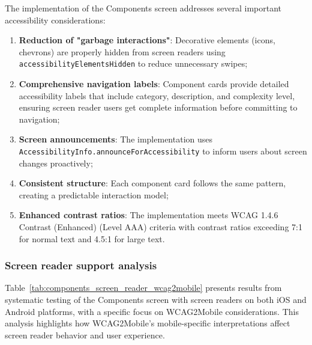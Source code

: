 \FloatBarrier

The implementation of the Components screen addresses several important accessibility considerations:

\begin{enumerate}
    \item \textbf{Reduction of "garbage interactions"}: Decorative elements (icons, chevrons) are properly hidden from screen readers using \texttt{accessibilityElementsHidden} to reduce unnecessary swipes;
    
    \item \textbf{Comprehensive navigation labels}: Component cards provide detailed accessibility labels that include category, description, and complexity level, ensuring screen reader users get complete information before committing to navigation;
    
    \item \textbf{Screen announcements}: The implementation uses \\ \texttt{AccessibilityInfo.announceForAccessibility} to inform users about screen changes proactively;
    
    \item \textbf{Consistent structure}: Each component card follows the same pattern, creating a predictable interaction model;
    
    \item \textbf{Enhanced contrast ratios}: The implementation meets WCAG 1.4.6 Contrast (Enhanced) (Level AAA) criteria with contrast ratios exceeding 7:1 for normal text and 4.5:1 for large text.
\end{enumerate}

\FloatBarrier

\subsubsection{Screen reader support analysis}

Table~\ref{tab:components_screen_reader_wcag2mobile} presents results from systematic testing of the Components screen with screen readers on both iOS and Android platforms, with a specific focus on WCAG2Mobile considerations. This analysis highlights how WCAG2Mobile's mobile-specific interpretations affect screen reader behavior and user experience.

